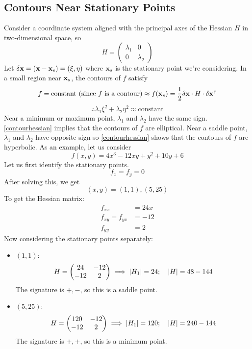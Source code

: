 \subsection{Contours Near Stationary Points}
Consider a coordinate system aligned with the principal axes of the Hessian \(H\) in two-dimensional space, so
\[ H = \begin{pmatrix}
		\lambda_1 & 0 \\ 0 & \lambda_2
	\end{pmatrix} \]
Let \(\delta \vb x = (\vb x - \vb x_s) = (\xi, \eta)\) where \(\vb x_s\) is the stationary point we're considering. In a small region near \(\vb x_s\), the contours of \(f\) satisfy
\[ f = \text{constant (since \(f\) is a contour)} \approx f(\vb x_s) = \frac{1}{2}\delta \vb x \cdot H \cdot \delta \vb x^\intercal \]
\begin{equation}\label{contourhessian}
	\therefore \lambda_1 \xi^2 + \lambda_2 \eta^2 \approx \text{constant}
\end{equation}
Near a minimum or maximum point, \(\lambda_1\) and \(\lambda_2\) have the same sign. \eqref{contourhessian} implies that the contours of \(f\) are elliptical. Near a saddle point, \(\lambda_1\) and \(\lambda_2\) have opposite sign so \eqref{contourhessian} shows that the contours of \(f\) are hyperbolic. As an example, let us consider
\[ f(x,y) = 4x^3 - 12xy + y^2 + 10y + 6 \]
Let us first identify the stationary points.
\[ f_x = f_y = 0 \]
After solving this, we get
\[ (x,y) = (1, 1), (5, 25) \]
To get the Hessian matrix:
\begin{align*}
	f_{xx}          & = 24x \\
	f_{xy} = f_{yx} & = -12 \\
	f_{yy}          & = 2
\end{align*}
Now considering the stationary points separately:
\begin{itemize}
	\item \((1, 1)\):
	      \[ H = \begin{pmatrix}
			      24 & -12 \\ -12 & 2
		      \end{pmatrix} \implies \abs{H_1} = 24;\quad \abs{H} = 48-144 \]
	      The signature is \(+, -\), so this is a saddle point.
	\item \((5, 25)\):
	      \[ H = \begin{pmatrix}
			      120 & -12 \\ -12 & 2
		      \end{pmatrix} \implies \abs{H_1} = 120;\quad \abs{H} = 240-144 \]
	      The signature is \(+, +\), so this is a minimum point.
\end{itemize}

